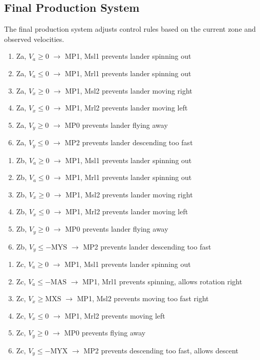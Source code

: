 \documentclass{article}
\begin{document}
\subsection{Final Production System}
The final production system adjusts control rules based on the current zone and observed velocities. 
\\

\begin{enumerate}
    \item Za, $V_a \geq 0$ $\rightarrow$ MP1, Msl1 \hfill prevents lander spinning out
    \item Za, $V_a \leq 0$ $\rightarrow$ MP1, Mrl1 \hfill prevents lander spinning out
    \item Za, $V_x \geq 0$ $\rightarrow$ MP1, Msl2 \hfill prevents lander moving right
    \item Za, $V_x \leq 0$ $\rightarrow$ MP1, Mrl2 \hfill prevents lander moving left
    \item Za, $V_y \geq 0$ $\rightarrow$ MP0 \hfill prevents lander flying away
    \item Za, $V_y \leq 0$ $\rightarrow$ MP2 \hfill prevents lander descending too fast
\end{enumerate}
    
\begin{enumerate}
    \item Zb, $V_a \geq 0$ $\rightarrow$ MP1, Msl1 \hfill prevents lander spinning out
    \item Zb, $V_a \leq 0$ $\rightarrow$ MP1, Mrl1 \hfill prevents lander spinning out
    \item Zb, $V_x \geq 0$ $\rightarrow$ MP1, Msl2 \hfill prevents lander moving right
    \item Zb, $V_x \leq 0$ $\rightarrow$ MP1, Mrl2 \hfill prevents lander moving left
    \item Zb, $V_y \geq 0$ $\rightarrow$ MP0 \hfill prevents lander flying away
    \item Zb, $V_y \leq -\text{MYS}$ $\rightarrow$ MP2 \hfill prevents lander descending too fast
\end{enumerate}
    
\begin{enumerate}
    \item Zc, $V_a \geq 0$ $\rightarrow$ MP1, Msl1 \hfill prevents lander spinning out
    \item Zc, $V_a \leq -\text{MAS}$ $\rightarrow$ MP1, Mrl1 \hfill prevents spinning, allows rotation right
    \item Zc, $V_x \geq \text{MXS}$ $\rightarrow$ MP1, Msl2 \hfill prevents moving too fast right
    \item Zc, $V_x \leq 0$ $\rightarrow$ MP1, Mrl2 \hfill prevents moving left
    \item Zc, $V_y \geq 0$ $\rightarrow$ MP0 \hfill prevents flying away
    \item Zc, $V_y \leq -\text{MYX}$ $\rightarrow$ MP2 \hfill prevents descending too fast, allows descent
\end{enumerate}
    
\end{document}
